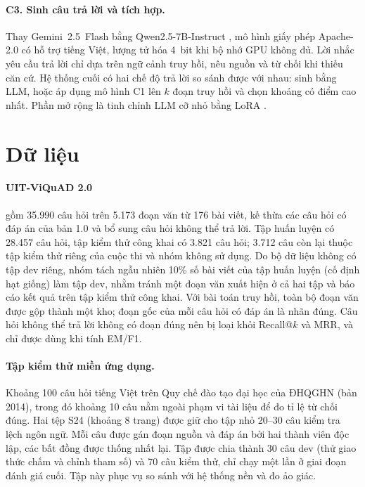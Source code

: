\documentclass[11pt]{article}
\begin{document}
\paragraph{C3. Sinh câu trả lời và tích hợp.} Thay Gemini~2.5~Flash bằng Qwen2.5-7B-Instruct \citep{qwen2024qwen25}, mô hình giấy phép Apache-2.0 có hỗ trợ tiếng Việt, lượng tử hóa 4~bit khi bộ nhớ GPU không đủ. Lời nhắc yêu cầu trả lời chỉ dựa trên ngữ cảnh truy hồi, nêu nguồn và từ chối khi thiếu căn cứ. Hệ thống cuối có hai chế độ trả lời so sánh được với nhau: sinh bằng LLM, hoặc áp dụng mô hình C1 lên $k$ đoạn truy hồi và chọn khoảng có điểm cao nhất. Phần mở rộng là tinh chỉnh LLM cỡ nhỏ bằng LoRA \citep{hu2022lora}.

\section{Dữ liệu}

\paragraph{UIT-ViQuAD 2.0} \citep{nguyen2022vimrc} gồm 35.990 câu hỏi trên 5.173 đoạn văn từ 176 bài viết, kế thừa các câu hỏi có đáp án của bản 1.0 \citep{nguyen-etal-2020-vietnamese} và bổ sung câu hỏi không thể trả lời. Tập huấn luyện có 28.457 câu hỏi, tập kiểm thử công khai có 3.821 câu hỏi; 3.712 câu còn lại thuộc tập kiểm thử riêng của cuộc thi và nhóm không sử dụng. Do bộ dữ liệu không có tập dev riêng, nhóm tách ngẫu nhiên 10\% số bài viết của tập huấn luyện (cố định hạt giống) làm tập dev, nhằm tránh một đoạn văn xuất hiện ở cả hai tập và báo cáo kết quả trên tập kiểm thử công khai. Với bài toán truy hồi, toàn bộ đoạn văn được gộp thành một kho; đoạn gốc của mỗi câu hỏi có đáp án là nhãn đúng. Câu hỏi không thể trả lời không có đoạn đúng nên bị loại khỏi Recall@$k$ và MRR, và chỉ được dùng khi tính EM/F1.

\paragraph{Tập kiểm thử miền ứng dụng.} Khoảng 100 câu hỏi tiếng Việt trên Quy chế đào tạo đại học của ĐHQGHN (bản 2014), trong đó khoảng 10 câu nằm ngoài phạm vi tài liệu để đo tỉ lệ từ chối đúng. Hai tệp S24 (khoảng 8 trang) được giữ cho tập nhỏ 20--30 câu kiểm tra lệch ngôn ngữ. Mỗi câu được gán đoạn nguồn và đáp án bởi hai thành viên độc lập, các bất đồng được thống nhất lại. Tập được chia thành 30 câu dev (thử giao thức chấm và chỉnh tham số) và 70 câu kiểm thử, chỉ chạy một lần ở giai đoạn đánh giá cuối. Tập này phục vụ so sánh với hệ thống nền và đo ảo giác.
\end{document}

